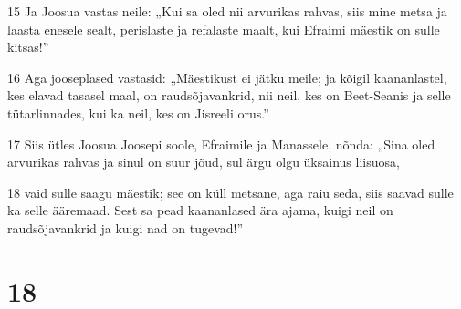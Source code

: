 \par 15 Ja Joosua vastas neile: „Kui sa oled nii arvurikas rahvas, siis mine metsa ja laasta enesele sealt, perislaste ja refalaste maalt, kui Efraimi mäestik on sulle kitsas!”
\par 16 Aga jooseplased vastasid: „Mäestikust ei jätku meile; ja kõigil kaananlastel, kes elavad tasasel maal, on raudsõjavankrid, nii neil, kes on Beet-Seanis ja selle tütarlinnades, kui ka neil, kes on Jisreeli orus.”
\par 17 Siis ütles Joosua Joosepi soole, Efraimile ja Manassele, nõnda: „Sina oled arvurikas rahvas ja sinul on suur jõud, sul ärgu olgu üksainus liisuosa,
\par 18 vaid sulle saagu mäestik; see on küll metsane, aga raiu seda, siis saavad sulle ka selle ääremaad. Sest sa pead kaananlased ära ajama, kuigi neil on raudsõjavankrid ja kuigi nad on tugevad!”

\chapter{18}


